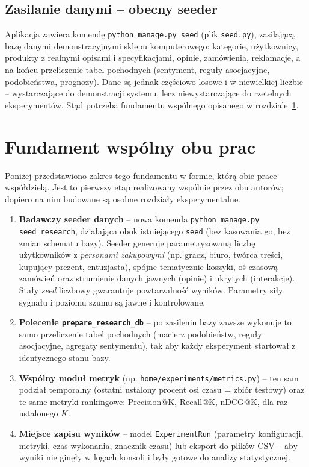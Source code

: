 \documentclass[12pt,a4paper]{article}
\begin{document}
\subsection*{Zasilanie danymi -- obecny seeder}

Aplikacja zawiera komendę \texttt{python manage.py seed} (plik \texttt{seed.py}), zasilającą bazę danymi demonstracyjnymi sklepu komputerowego: kategorie, użytkownicy, produkty z realnymi opisami i specyfikacjami, opinie, zamówienia, reklamacje, a na końcu przeliczenie tabel pochodnych (sentyment, reguły asocjacyjne, podobieństwa, prognozy). Dane są jednak częściowo losowe i w niewielkiej liczbie -- wystarczające do demonstracji systemu, lecz niewystarczające do rzetelnych eksperymentów. Stąd potrzeba fundamentu wspólnego opisanego w rozdziale~\ref{sec:fundament}.

\section{Fundament wspólny obu prac}
\label{sec:fundament}

Poniżej przedstawiono zakres tego fundamentu w formie, którą obie prace współdzielą. Jest to pierwszy etap realizowany wspólnie przez obu autorów; dopiero na nim budowane są osobne rozdziały eksperymentalne.

\begin{enumerate}
\item \textbf{Badawczy seeder danych} -- nowa komenda \texttt{python manage.py seed\_research}, działająca obok istniejącego \texttt{seed} (bez kasowania go, bez zmian schematu bazy). Seeder generuje parametryzowaną liczbę użytkowników z \emph{personami zakupowymi} (np. gracz, biuro, twórca treści, kupujący prezent, entuzjasta), spójne tematycznie koszyki, oś czasową zamówień oraz strumienie danych jawnych (opinie) i ukrytych (interakcje). Stały \emph{seed} liczbowy gwarantuje powtarzalność wyników. Parametry siły sygnału i poziomu szumu są jawne i kontrolowane.

\item \textbf{Polecenie \texttt{prepare\_research\_db}} -- po zasileniu bazy zawsze wykonuje to samo przeliczenie tabel pochodnych (macierz podobieństw, reguły asocjacyjne, agregaty sentymentu), tak aby każdy eksperyment startował z identycznego stanu bazy.

\item \textbf{Wspólny moduł metryk} (np. \texttt{home/experiments/metrics.py}) -- ten sam podział temporalny (ostatni ustalony procent osi czasu = zbiór testowy) oraz te same metryki rankingowe: Precision@K, Recall@K, nDCG@K, dla raz ustalonego $K$.

\item \textbf{Miejsce zapisu wyników} -- model \texttt{ExperimentRun} (parametry konfiguracji, metryki, czas wykonania, znacznik czasu) lub eksport do plików CSV -- aby wyniki nie ginęły w logach konsoli i były gotowe do analizy statystycznej.
\end{enumerate}
\end{document}
